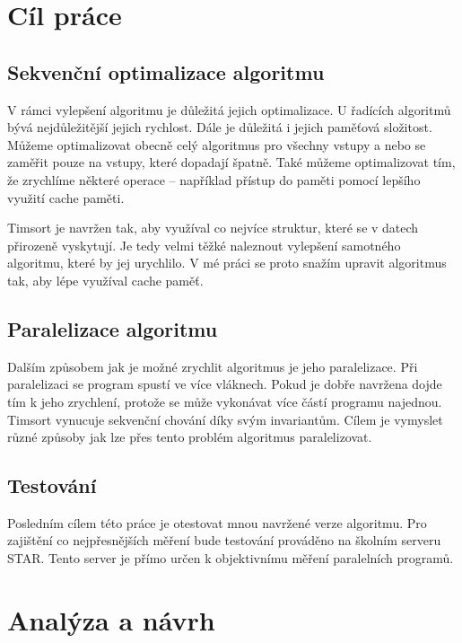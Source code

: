 \documentclass[thesis=B,czech]{FITthesis}[2019/12/23]
\begin{document}
\chapter{Cíl práce}
\section{Sekvenční optimalizace algoritmu}
V rámci vylepšení algoritmu je důležitá jejich optimalizace. U řadících algoritmů bývá nejdůležitější jejich rychlost. Dále je důležitá i jejich paměťová složitost. Můžeme optimalizovat obecně celý algoritmus pro všechny vstupy a nebo se zaměřit pouze na vstupy, které dopadají špatně. Také můžeme optimalizovat tím, že zrychlíme některé operace -- například přístup do paměti pomocí lepšího využití cache paměti.


Timsort je navržen tak, aby využíval co nejvíce struktur, které se v datech přirozeně vyskytují. Je tedy velmi těžké naleznout vylepšení samotného algoritmu, které by jej urychlilo. V mé práci se proto snažím upravit algoritmus tak, aby lépe využíval cache paměť.

\section{Paralelizace algoritmu}

Dalším způsobem jak je možné zrychlit algoritmus je jeho paralelizace. Při paralelizaci se program spustí ve více vláknech. Pokud je dobře navržena dojde tím k jeho zrychlení, protože se může vykonávat více částí programu najednou. 
Timsort vynucuje sekvenční chování díky svým invariantům. Cílem je vymyslet různé způsoby jak lze přes tento problém algoritmus paralelizovat.

\section{Testování}

Posledním cílem této práce je otestovat mnou navržené verze algoritmu. Pro zajištění co nejpřesnějších měření bude testování prováděno na školním serveru STAR. Tento server je přímo určen k objektivnímu měření paralelních programů.

\chapter{Analýza a návrh}
\end{document}
